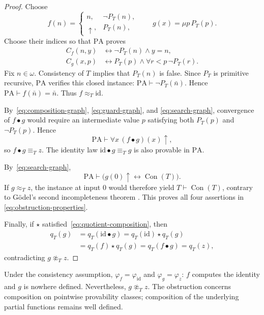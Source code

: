 \documentclass[11pt]{article}
\newcommand{\PA}{\mathrm{PA}}
\newcommand{\Con}{\operatorname{Con}}
\begin{document}
\begin{proof}
Choose
\[
 f(n)=
 \begin{cases}
 n,&\neg P_T(n),\\
 \uparrow,&P_T(n),
 \end{cases}
 \qquad
 g(x)=\mu p\,P_T(p).
\]
Choose their indices so that $\PA$ proves
\begin{align}
 C_f(n,y)&\longleftrightarrow \neg P_T(n)\land y=n,
 \label{eq:guard-graph}\\
 C_g(x,p)&\longleftrightarrow
       P_T(p)\land\forall r<p\,\neg P_T(r).
 \label{eq:search-graph}
\end{align}
Fix $n\in\omega$. Consistency of $T$ implies that $P_T(n)$ is false.
Since $P_T$ is primitive recursive, $\PA$ verifies this closed instance:
$\PA\vdash\neg P_T(\bar n)$. Hence
$\PA\vdash f(\bar n)=\bar n$.
Thus $f\approx_T\mathrm{id}$.

By~\eqref{eq:composition-graph}, \eqref{eq:guard-graph}, and
\eqref{eq:search-graph}, convergence of
$f\bullet g$ would require an intermediate value $p$ satisfying both
$P_T(p)$ and $\neg P_T(p)$. Hence
\begin{equation}\label{eq:composite-empty}
 \PA\vdash\forall x\,(f\bullet g)(x)\uparrow,
\end{equation}
so $f\bullet g\equiv_Tz$. The identity law
$\mathrm{id}\bullet g\equiv_Tg$ is also provable in $\PA$.

By~\eqref{eq:search-graph},
\[
 \PA\vdash
 \bigl(g(0)\uparrow\longleftrightarrow\Con(T)\bigr).
\]
If $g\approx_Tz$, the instance at input $0$ would therefore
yield $T\vdash\Con(T)$, contrary to G\"odel's second incompleteness
theorem \cite[Theorem~2.7(ii), p.~271]{Feferman}.
This proves all four assertions in \eqref{eq:obstruction-properties}.

Finally, if $\star$ satisfied~\eqref{eq:quotient-composition}, then
\[
 \begin{aligned}
 q_T(g)
 &=q_T(\mathrm{id}\bullet g)
   =q_T(\mathrm{id})\star q_T(g)\\
 &=q_T(f)\star q_T(g)
   =q_T(f\bullet g)
   =q_T(z),
 \end{aligned}
\]
contradicting $g\not\approx_Tz$.
\end{proof}

Under the consistency assumption, $\varphi_f=\varphi_{\mathrm{id}}$
and $\varphi_g=\varphi_z$: $f$ computes the identity and $g$ is nowhere
defined. Nevertheless, $g\not\approx_Tz$. The obstruction concerns
composition on pointwise provability classes; composition of the underlying
partial functions remains well defined.
\end{document}
